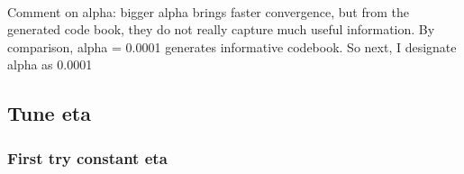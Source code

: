 \documentclass[11pt]{article}
\begin{document}
    \begin{center}
    \end{center}
    { \hspace*{\fill} \\}
    
    \begin{center}
    \end{center}
    { \hspace*{\fill} \\}
    
    \begin{center}
    \end{center}
    { \hspace*{\fill} \\}
    
    \begin{center}
    \end{center}
    { \hspace*{\fill} \\}
    
    \begin{center}
    \end{center}
    { \hspace*{\fill} \\}
    
    \begin{center}
    \end{center}
    { \hspace*{\fill} \\}
    
    Comment on alpha: bigger alpha brings faster convergence, but from the
generated code book, they do not really capture much useful information.
By comparison, alpha = 0.0001 generates informative codebook. So next, I
designate alpha as 0.0001

    \subsection{Tune eta}\label{tune-eta}

\subsubsection{First try constant eta}\label{first-try-constant-eta}
\end{document}
